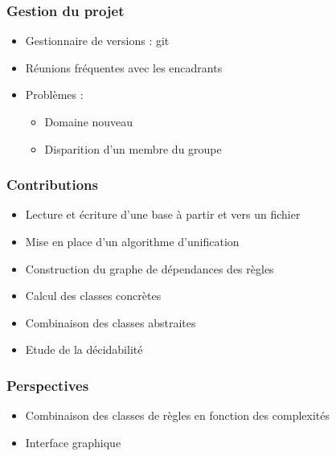 
\begin{frame}
	\frametitle{Gestion du projet}
	\begin{itemize}
		\item Gestionnaire de versions : git
		\item Réunions fréquentes avec les encadrants
		\item Problèmes :
		\begin{itemize}
			\item Domaine nouveau
			\item Disparition d'un membre du groupe
		\end{itemize}
	\end{itemize}
\end{frame}

\begin{frame}
	\frametitle{Contributions}
	\begin{itemize}
		\item Lecture et écriture d'une base à partir et vers un fichier
		\item Mise en place d'un algorithme d'unification
		\item Construction du graphe de dépendances des règles
		\item Calcul des classes concrètes
		\item Combinaison des classes abstraites
		\item Etude de la décidabilité
	\end{itemize}
\end{frame}

\begin{frame}
	\frametitle{Perspectives}
	\begin{itemize}
		\item Combinaison des classes de règles en fonction des complexités
		\item Interface graphique
	\end{itemize}
\end{frame}

